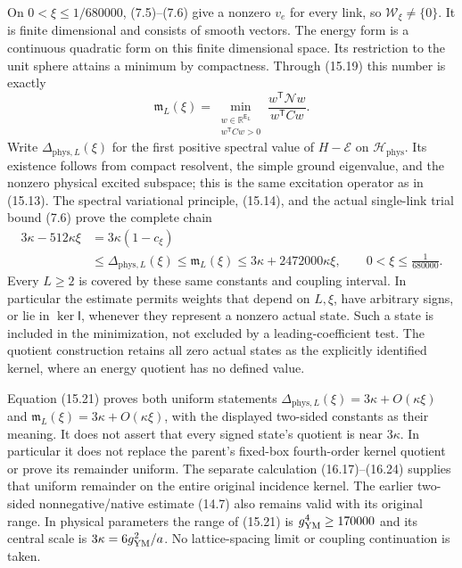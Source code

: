 \documentclass[
]{article}
\begin{document}
On \(0<\xi\le1/680000\), (7.5)--(7.6) give a nonzero \(v_e\) for every
link, so \(\mathscr W_\xi\ne\{0\}\). It is finite dimensional and
consists of smooth vectors. The energy form is a continuous quadratic
form on this finite dimensional space. Its restriction to the unit
sphere attains a minimum by compactness. Through (15.19) this number is
exactly \[
\mathfrak m_L(\xi)
 =\min_{\substack{w\in\mathbb R^{\mathsf E_L}\\
                  w^{\mathsf T}Cw>0}}
       \frac{w^{\mathsf T}\mathcal N w}{w^{\mathsf T}Cw}.
                                                               \tag{15.20}
\] Write \(\Delta_{\mathrm{phys},L}(\xi)\) for the first positive
spectral value of \(H-\mathcal E\) on \(\mathcal H_{\mathrm{phys}}\).
Its existence follows from compact resolvent, the simple ground
eigenvalue, and the nonzero physical excited subspace; this is the same
excitation operator as in (15.13). The spectral variational principle,
(15.14), and the actual single-link trial bound (7.6) prove the complete
chain \[
\begin{split}
3\kappa-512\kappa\xi
 &=3\kappa(1-c_\xi)\\
 &\le\Delta_{\mathrm{phys},L}(\xi)
 \le\mathfrak m_L(\xi)
 \le3\kappa+2472000\kappa\xi ,
\qquad 0<\xi\le\frac1{680000}.
\end{split}                                                \tag{15.21}
\] Every \(L\ge2\) is covered by these same constants and coupling
interval. In particular the estimate permits weights that depend on
\(L,\xi\), have arbitrary signs, or lie in \(\ker\mathsf I\), whenever
they represent a nonzero actual state. Such a state is included in the
minimization, not excluded by a leading-coefficient test. The quotient
construction retains all zero actual states as the explicitly identified
kernel, where an energy quotient has no defined value.

Equation (15.21) proves both uniform statements
\(\Delta_{\mathrm{phys},L}(\xi)=3\kappa+O(\kappa\xi)\) and
\(\mathfrak m_L(\xi)=3\kappa+O(\kappa\xi)\), with the displayed
two-sided constants as their meaning. It does not assert that every
signed state's quotient is near \(3\kappa\). In particular it does not
replace the parent's fixed-box fourth-order kernel quotient or prove its
remainder uniform. The separate calculation (16.17)--(16.24) supplies
that uniform remainder on the entire original incidence kernel. The
earlier two-sided nonnegative/native estimate (14.7) also remains valid
with its original range. In physical parameters the range of (15.21) is
\(g_{\rm YM}^4\ge170000\) and its central scale is
\(3\kappa=6g_{\rm YM}^2/a\). No lattice-spacing limit or coupling
continuation is taken.
\end{document}
